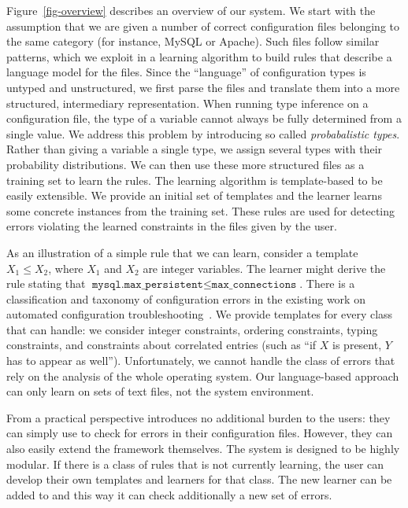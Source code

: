 Figure~\ref{fig-overview} describes an overview of our system. We start
with the assumption that we are given a number of correct configuration
files belonging to the same category (for instance, MySQL or
Apache). Such files follow similar patterns, which we exploit
in a learning algorithm to build rules that
describe a language model for the files. Since the
``language'' of configuration types is untyped and unstructured, we
first parse the files and translate them into a more structured,
intermediary representation.
When running type inference on a configuration file, the type of a variable cannot always be fully determined from a single value.
We address this problem by introducing so called {\emph{probabalistic types}}.
Rather than giving a variable a single type, we assign several types with their probability distributions. 
We can then use these more structured files
as a training set to learn the rules. The learning algorithm
is template-based to be easily extensible. We provide an initial set of templates and the
learner learns some concrete instances from the training set. These
rules are used for detecting errors violating the learned constraints
in the files given by the user.

As an 
illustration of a simple rule that we can learn, consider a template
 $X_1 \le X_2$, where $X_1$ and $X_2$ are
integer variables. The learner might derive the rule stating that
$\texttt{mysql.max\_persistent} \le \texttt{max\_connections}$. There is a classification and taxonomy of configuration errors in the 
existing work on automated configuration troubleshooting~\cite{yin11anempirical, configdataset}. We provide templates for every class that \app can handle: we consider integer constraints, ordering
constraints, typing constraints, and constraints about correlated entries (such as ``if $X$ is present, $Y$ has to appear as well''). 
Unfortunately, we cannot handle the class of errors that rely on the analysis of the whole operating system.
Our language-based approach can only learn on sets of text files, not the system environment.

From a practical perspective \app introduces no additional burden 
to the users: they can simply use \app to check for errors in their configuration files. However, they can also easily extend the framework themselves. The system is designed to be highly modular. If there is a class of rules that \app is not currently learning, the user can develop their own templates and learners for that class. The new learner can be added to \app and this way it can check additionally a new set of errors.

